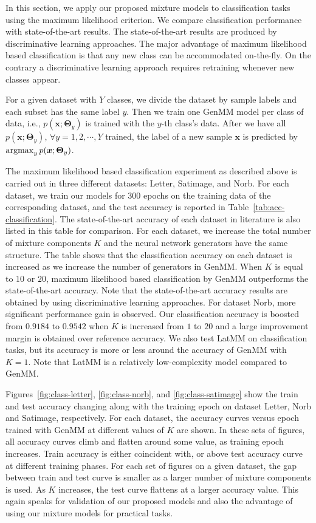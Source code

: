 In this section, we apply our proposed mixture models to classification tasks using the maximum likelihood criterion. We compare classification performance with state-of-the-art results. The state-of-the-art results are produced by discriminative learning approaches. The major advantage of maximum likelihood based classification is that any new class can be accommodated on-the-fly. On the contrary a discriminative learning approach requires retraining whenever new classes appear. 

For a given dataset with $Y$ classes, we divide the dataset by sample labels and each subset has the same label $y$. Then we train one GenMM model per class of data, i.e., $p(\bm{x};\bm{\Theta}_{y})$ is trained with the $y$-th class's data. After we have all $p(\bm{x};\bm{\Theta}_y)$, $\forall y = 1, 2, \cdots, Y$ trained, the label of a new sample $\bm{x}$ is predicted by $\operatorname{argmax}_{y} p(\bm{x};\bm{\Theta}_y)$.

The maximum likelihood based classification experiment as described above is carried out in three different datasets: Letter, Satimage, and Norb. For each dataset, we train our models for $300$ epochs on the training data of the corresponding dataset, and the test accuracy is reported in Table~\ref{tab:acc-classification}. The state-of-the-art accuracy of each dataset in literature is also listed in this table for comparison. For each dataset, we increase the total number of mixture components $K$ and the neural network generators have the same structure. The table shows that the classification accuracy on each dataset is increased as we increase the number of generators in GenMM. When $K$ is equal to $10$ or $20$, maximum likelihood based classification by GenMM outperforms the state-of-the-art accuracy. Note that the state-of-the-art accuracy results are obtained by using discriminative learning approaches. For dataset Norb, more significant performance gain is observed. Our classification accuracy is boosted from $0.9184$ to $0.9542$ when $K$ is increased from $1$ to $20$ and a large improvement margin is obtained over reference accuracy. We also test LatMM on classification tasks, but its accuracy is more or less around the accuracy of GenMM with $K=1$. Note that LatMM is a relatively low-complexity model compared to GenMM. 

Figures~\ref{fig:class-letter}, \ref{fig:class-norb}, and \ref{fig:class-satimage} show the train and test accuracy changing along with the training epoch on dataset Letter, Norb and Satimage, respectively. For each dataset, the accuracy curves versus epoch trained with GenMM at different values of $K$ are shown. In these sets of figures, all accuracy curves climb and flatten around some value, as training epoch increases. Train accuracy is either coincident with, or above test accuracy curve at different training phases. For each set of figures on a given dataset, the gap between train and test curve is smaller as a larger number of mixture components is used. As $K$ increases, the test curve flattens at a larger accuracy value. This again speaks for validation of our proposed models and also the advantage of using our mixture models for practical tasks.

